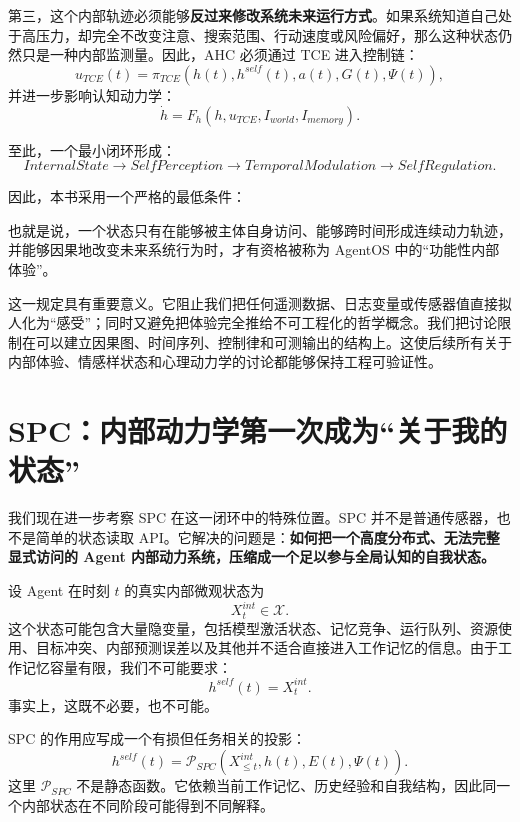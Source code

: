 第三，这个内部轨迹必须能够\textbf{反过来修改系统未来运行方式}。如果系统知道自己处于高压力，却完全不改变注意、搜索范围、行动速度或风险偏好，那么这种状态仍然只是一种内部监测量。因此，AHC 必须通过 TCE 进入控制链：
\[
u_{TCE}(t)
=
\pi_{TCE}
\left(
h(t),
h^{self}(t),
a(t),
G(t),
\Psi(t)
\right),
\]
并进一步影响认知动力学：
\[
\dot h
=
F_h
\left(
h,
u_{TCE},
I_{world},
I_{memory}
\right).
\]

至此，一个最小闭环形成：
\[
InternalState
\rightarrow
SelfPerception
\rightarrow
TemporalModulation
\rightarrow
SelfRegulation.
\]

因此，本书采用一个严格的最低条件：

\begin{statementbox}
\centering
{}
\end{statementbox}

也就是说，一个状态只有在能够被主体自身访问、能够跨时间形成连续动力轨迹，并能够因果地改变未来系统行为时，才有资格被称为 AgentOS 中的``功能性内部体验''。

这一规定具有重要意义。它阻止我们把任何遥测数据、日志变量或传感器值直接拟人化为``感受''；同时又避免把体验完全推给不可工程化的哲学概念。我们把讨论限制在可以建立因果图、时间序列、控制律和可测输出的结构上。这使后续所有关于内部体验、情感样状态和心理动力学的讨论都能够保持工程可验证性。

\section{SPC：内部动力学第一次成为``关于我的状态''}

我们现在进一步考察 SPC 在这一闭环中的特殊位置。SPC 并不是普通传感器，也不是简单的状态读取 API。它解决的问题是：\textbf{如何把一个高度分布式、无法完整显式访问的 Agent 内部动力系统，压缩成一个足以参与全局认知的自我状态。}

设 Agent 在时刻 $t$ 的真实内部微观状态为
\[
X_t^{int}\in\mathcal X.
\]
这个状态可能包含大量隐变量，包括模型激活状态、记忆竞争、运行队列、资源使用、目标冲突、内部预测误差以及其他并不适合直接进入工作记忆的信息。由于工作记忆容量有限，我们不可能要求：
\[
h^{self}(t)=X_t^{int}.
\]
事实上，这既不必要，也不可能。

SPC 的作用应写成一个有损但任务相关的投影：
\[
\boxed{
h^{self}(t)
=
\mathcal P_{SPC}
\left(
X_{\leq t}^{int},
h(t),
E(t),
\Psi(t)
\right).
}
\]
这里 $\mathcal P_{SPC}$ 不是静态函数。它依赖当前工作记忆、历史经验和自我结构，因此同一个内部状态在不同阶段可能得到不同解释。

